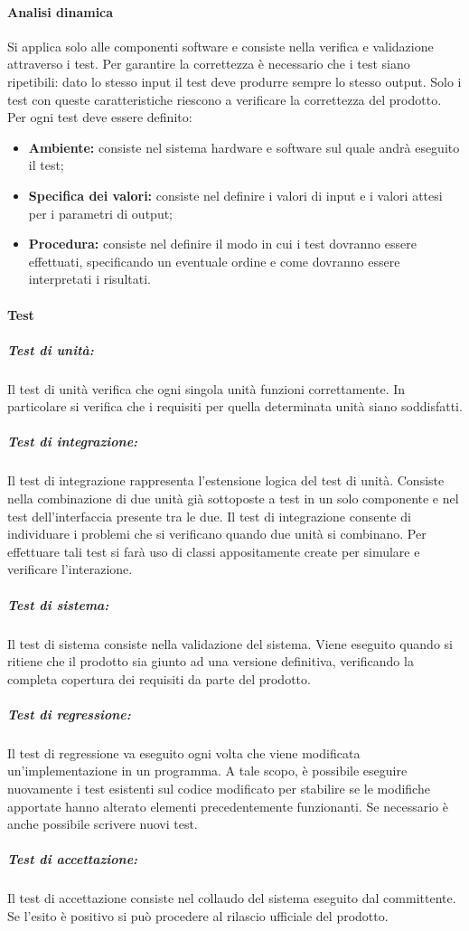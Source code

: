 	\paragraph{Analisi dinamica}
Si applica solo alle componenti software e consiste nella verifica e validazione attraverso i test. Per garantire la correttezza è necessario che i test siano ripetibili: dato lo stesso input il test deve produrre sempre lo stesso output. Solo i test con queste caratteristiche riescono a verificare la correttezza del prodotto.\\
Per ogni test deve essere definito:
\begin{itemize}
	\item \textbf{Ambiente: }consiste nel sistema hardware e software sul quale andrà eseguito il test;
	\item \textbf{Specifica dei valori: }consiste nel definire i valori di input e i valori attesi per i parametri di output;
	\item \textbf{Procedura: }consiste nel definire il modo in cui i test dovranno essere effettuati, specificando un eventuale ordine e come dovranno essere interpretati i risultati.  
\end{itemize}

	\paragraph{Test}
		\subparagraph{Test di unità:}
		Il test di unità verifica che ogni singola unità funzioni correttamente. In particolare si verifica che i requisiti per quella determinata unità siano soddisfatti.
		\subparagraph{Test di integrazione:}
		Il test di integrazione rappresenta l'estensione logica del test di unità. Consiste nella combinazione di due unità già sottoposte a test in un solo componente e nel test dell'interfaccia presente tra le due. Il test di integrazione consente di individuare i problemi che si verificano quando due unità si combinano. Per effettuare tali test si farà uso di classi appositamente create per simulare e verificare l'interazione.
		\subparagraph{Test di sistema:}
		Il test di sistema consiste nella validazione del sistema. Viene eseguito quando si ritiene che il prodotto sia giunto ad una versione definitiva, verificando la completa copertura dei requisiti da parte del prodotto.
		\subparagraph{Test di regressione:}
		Il test di regressione va eseguito ogni volta che viene modificata un'implementazione in un programma. A tale scopo, è possibile eseguire nuovamente i test esistenti sul codice modificato per stabilire se le modifiche apportate hanno alterato elementi precedentemente funzionanti. Se necessario è anche possibile scrivere nuovi test.
		\subparagraph{Test di accettazione:}
		Il test di accettazione consiste nel collaudo del sistema eseguito dal committente. Se l'esito è positivo si può procedere al rilascio ufficiale del prodotto.

